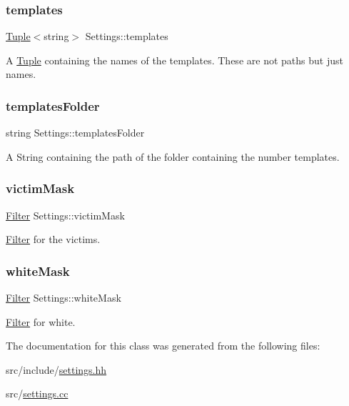 \subsubsection{\texorpdfstring{templates}{templates}}
{\footnotesize\ttfamily \mbox{\hyperlink{class_tuple}{Tuple}}$<$string$>$ Settings\+::templates}



A \mbox{\hyperlink{class_tuple}{Tuple}} containing the names of the templates. These are not paths but just names. 

\mbox{\label{class_settings_a3c272482637bc9c3a534e08e75157830}} 
\subsubsection{\texorpdfstring{templatesFolder}{templatesFolder}}
{\footnotesize\ttfamily string Settings\+::templates\+Folder}



A String containing the path of the folder containing the number templates. 

\mbox{\label{class_settings_ad77dc9d3ebdc000309f1279bc0f9e1ea}} 
\subsubsection{\texorpdfstring{victimMask}{victimMask}}
{\footnotesize\ttfamily \mbox{\hyperlink{class_filter}{Filter}} Settings\+::victim\+Mask}



\mbox{\hyperlink{class_filter}{Filter}} for the victims. 

\mbox{\label{class_settings_adcd52fec07542a958be5adf297969db4}} 
\subsubsection{\texorpdfstring{whiteMask}{whiteMask}}
{\footnotesize\ttfamily \mbox{\hyperlink{class_filter}{Filter}} Settings\+::white\+Mask}



\mbox{\hyperlink{class_filter}{Filter}} for white. 



The documentation for this class was generated from the following files\+:\begin{DoxyCompactItemize}
\item 
src/include/\mbox{\hyperlink{settings_8hh}{settings.\+hh}}\item 
src/\mbox{\hyperlink{settings_8cc}{settings.\+cc}}\end{DoxyCompactItemize}
